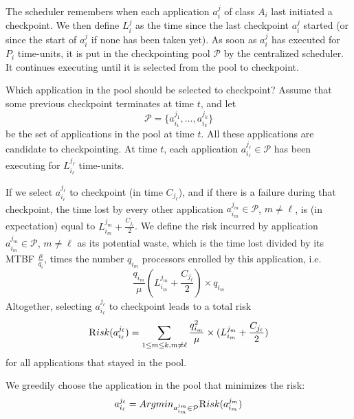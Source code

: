 \documentclass{article}
\newcommand{\app}[1]{A_{#1}}
\newcommand{\application}[2]{a_{#1}^{#2}}
\newcommand{\nbnodes}[1]{q_{#1}}
\newcommand{\period}[1]{P_{#1}}
\newcommand{\mtbfplat}{\mu}
\newcommand{\lastckpt}[2]{L_{#1}^{#2}}
\newcommand{\wastefct}[2]{W_{#1}(#2)}
\newcommand{\pool}{{\mathcal P}}
\newcommand{\risk}{{\textsc Risk}}
\begin{document}
The scheduler remembers when each application $\application{i}{j}$ of class
$\app{i}$ last initiated a checkpoint. We then define $\lastckpt{i}{j}$
as the time since the last checkpoint $\application{i}{j}$ started
(or since the start of $\application{i}{j}$ if none has been taken yet). 
As soon as $\application{i}{j}$ has executed for $P_{i}$ time-units,
it is put in the checkpointing pool $\pool$ by the centralized scheduler. It 
continues executing until it is selected from the pool to checkpoint.

Which application in the pool should be selected to checkpoint?
Assume that some previous checkpoint terminates at time $t$,
and let 
$$\pool = \{ \application{i_{1}}{j_{1}}, \dots, \application{i_{k}}{j_{k}} \}$$
be the set of applications  in the pool at time $t$. All these applications are 
candidate to checkpointing. At time $t$, each application $\application{i_{\ell}}{j_{\ell}} \in \pool$
has been executing for  $\lastckpt{i_{\ell}}{j_{\ell}}$ time-units.

If we select $\application{i_{\ell}}{j_{\ell}}$ to checkpoint (in time $C_{j_{\ell}}$),
and if there is a failure during that checkpoint, the time lost by every other application
$\application{i_{m}}{j_{m}} \in \pool$, $m \neq \ell$, is (in expectation) equal to
 $\lastckpt{i_m}{j_m} + \frac{C_{j_{\ell}}}{2}$. 
We define the risk incurred by application
$\application{i_{m}}{j_{m}} \in \pool$, $m \neq \ell$
as its potential waste, which is the time lost divided by its MTBF $\frac{\mtbfplat}{\nbnodes{i}}$,
times the number $\nbnodes{i_m}$ processors enrolled by this application, i.e.
$$ \frac{\nbnodes{i_{m}}}{\mtbfplat}  (\lastckpt{i_m}{j_m} + \frac{C_{j_{\ell}}}{2})
\times \nbnodes{i_m} $$
Altogether, selecting $\application{i_{\ell}}{j_{\ell}}$ to checkpoint leads to a total risk
$$\risk(\application{i_{\ell}}{j_{\ell}}) = \sum_{1 \leq m \leq k, m \neq \ell} \frac{\nbnodes{i_{m}}^{2}}{\mtbfplat}  \times (\lastckpt{i_m}{j_m} + \frac{C_{j_{\ell}}}{2})$$
  for all applications that stayed in the pool.
  
We greedily choose the application in the pool that minimizes the risk:
$$\application{i_{\ell}}{j_{\ell}} = Argmin_{\application{i_m}{j_m} \in \pool} \risk(\application{i_m}{j_m})$$

\end{document}
